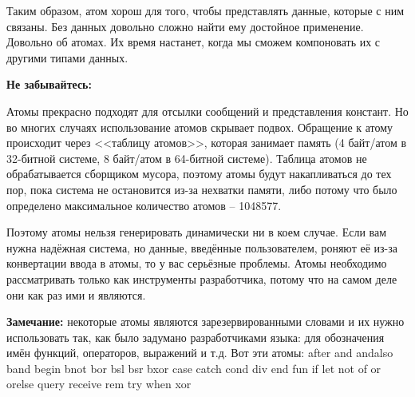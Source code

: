 \documentclass[a4paper,12pt]{report}
\newcommand{\ops}{\colorbox{lgreen}}
\begin{document}
Таким образом, атом хорош для того, чтобы представлять данные, которые с ним связаны. Без данных довольно сложно найти ему достойное применение. Довольно об атомах. Их время настанет, когда мы сможем компоновать их с другими типами данных.\\ 
\colorbox{lorange}
{
    \begin{minipage}{1.0\linewidth}
\textbf{Не забывайтесь:}

Атомы прекрасно подходят для отсылки сообщений и представления констант. Но во многих случаях использование атомов скрывает подвох. Обращение к атому происходит через <<таблицу атомов>>, которая занимает память (4 байт/атом в 32\--битной системе, 8 байт/атом в 64\--битной системе). Таблица атомов не обрабатывается сборщиком мусора, поэтому атомы будут накапливаться до тех пор, пока система не остановится из\--за нехватки памяти, либо потому что было определено максимальное количество атомов \--- 1048577.

Поэтому атомы нельзя генерировать динамически ни в коем случае. Если вам нужна надёжная система, но данные, введённые пользователем, роняют её из\--за конвертации ввода в атомы, то у вас серьёзные проблемы. Атомы необходимо рассматривать только как инструменты разработчика, потому что на самом деле они как раз ими и являются.
\end{minipage}
}
\colorbox{lgray}{
    \begin{minipage}{1.0\linewidth}
    \textbf{Замечание:} некоторые атомы являются зарезервированными словами и их нужно использовать так, как было задумано разработчиками языка: для обозначения имён функций, операторов, выражений и т.д. Вот эти атомы: \ops{after and andalso band begin}
\ops{bnot bor bsl bsr bxor case catch}
\ops{cond div end fun if let not of}
\ops{or orelse query receive rem try when xor}
\end{minipage}
}
\end{document}
